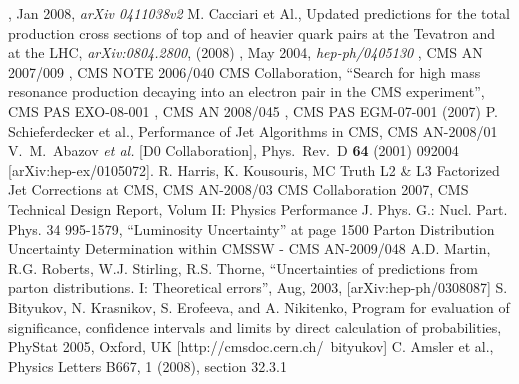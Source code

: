 \begin{thebibliography}{9}
, Jan 2008, {\em arXiv 0411038v2}
M. Cacciari et Al., Updated predictions for the total production cross sections of top 
 and of heavier quark pairs at the Tevatron and at the LHC, 
{\em arXiv:0804.2800}, (2008)
, May 2004, {\em hep-ph/0405130}
, CMS AN 2007/009
, CMS NOTE 2006/040
 {CMS Collaboration, ``Search for high mass resonance production decaying into an electron pair in the CMS experiment''}, CMS PAS EXO-08-001
, CMS AN 2008/045
, CMS PAS EGM-07-001 (2007)
 {P. Schieferdecker et al., Performance of Jet Algorithms in CMS}, CMS AN-2008/01
  V.~M.~Abazov {\it et al.}  [D0 Collaboration], 	 
  Phys.\ Rev.\  D {\bf 64} (2001) 092004 	 
  [arXiv:hep-ex/0105072]. 	 
 {R. Harris, K. Kousouris, MC Truth L2 \& L3 Factorized Jet Corrections at CMS}, CMS AN-2008/03
 {CMS Collaboration 2007, CMS Technical Design Report, Volum II: Physics Performance} 
J. Phys. G.: Nucl. Part. Phys. 34 995-1579, ``Luminosity Uncertainty'' at page 1500
 {Parton Distribution Uncertainty Determination within CMSSW - CMS AN-2009/048}
 {A.D. Martin, R.G. Roberts, W.J. Stirling, R.S. Thorne, 
``Uncertainties of predictions from parton distributions. I: Theoretical errors'', Aug, 2003, [arXiv:hep-ph/0308087]}
 S. Bityukov, N. Krasnikov, S. Erofeeva, and A. Nikitenko, Program for evaluation of significance,
  confidence intervals and limits by direct calculation of probabilities, PhyStat 2005, Oxford, UK 
  [http://cmsdoc.cern.ch/~bityukov]
  C. Amsler et al., Physics Letters B667, 1 (2008), section 32.3.1
  
\end{thebibliography}
 
%
